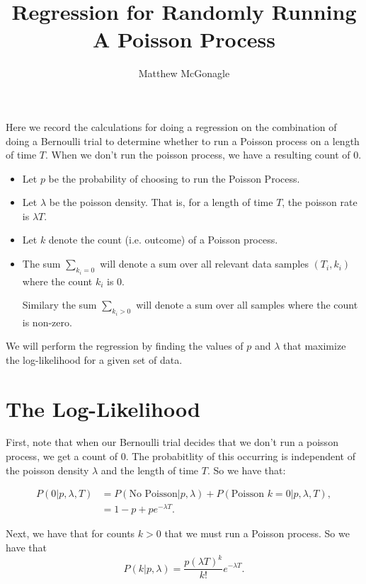 \documentclass{article}
\title{Regression for Randomly Running A Poisson Process}
\author{Matthew McGonagle}
\newcommand{\pRun}{p}
\begin{document}
\maketitle

Here we record the calculations for doing a regression on the combination of doing a Bernoulli trial to determine whether to run a Poisson process on a length of time \(T\). When we don't run the poisson process, we have a resulting count of 0.

\begin{itemize}
\item Let \(\pRun\) be the probability of choosing to run the Poisson Process.
\item Let \(\lambda\) be the poisson density. That is, for a length of time \(T\), the poisson rate is \(\lambda T\).
\item Let \(k\) denote the count (i.e. outcome) of a Poisson process.
\item The sum \(\sum_{k_i = 0}\) will denote a sum over all relevant data samples \((T_i, k_i)\) where the count \(k_i\) is 0. 

Similary the sum \(\sum_{k_i > 0}\) will denote a sum over all samples where the count is non-zero. 
\end{itemize}

We will perform the regression by finding the values of \(p\) and \(\lambda\) that maximize the log-likelihood for a given set of data.

\section{The Log-Likelihood}

First, note that when our Bernoulli trial decides that we don't run a poisson process, we get a count of 0. 
The probabitlity of this occurring is independent of the poisson density \(\lambda\) and the length of time \(T\). 
So we have that: 

\begin{align}
 P(0 | \pRun, \lambda, T) & = P(\text{No Poisson} | \pRun, \lambda) 
    + P(\text{Poisson }k = 0 | \pRun, \lambda, T), \\
& = 1 - \pRun + \pRun e^{-\lambda T}. 
\end{align}

Next, we have that for counts \(k > 0\) that we must run a Poisson process. So we have that 
\begin{equation}
P(k | \pRun, \lambda) = \frac{\pRun (\lambda T)^k}{k!} e^{-\lambda T}. 
\end{equation}
\end{document}
